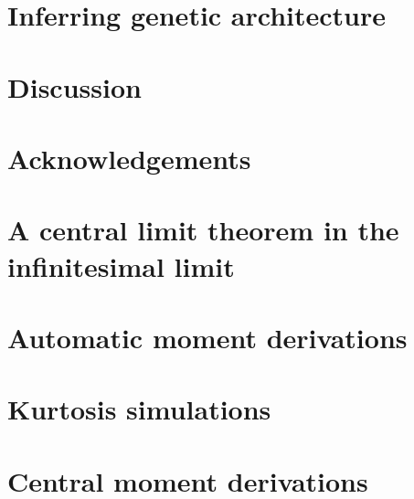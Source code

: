 \documentclass{article}
\newcommand{\beginsupplement}{%
        \setcounter{table}{0}
        \renewcommand{\thetable}{S\arabic{table}}%
        \setcounter{figure}{0}
        \renewcommand{\thefigure}{S\arabic{figure}}%
     }
\begin{document}
\section{Inferring genetic architecture}

\section{Discussion}

\section*{Acknowledgements}

 

\clearpage

\appendix
\beginsupplement

\section{A central limit theorem in the infinitesimal limit}
\label{clt}

\section{Automatic moment derivations}
\label{symmath}

\section{Kurtosis simulations}
\label{kurtsim}

\section{Central moment derivations}
\label{moments}

\end{document}
